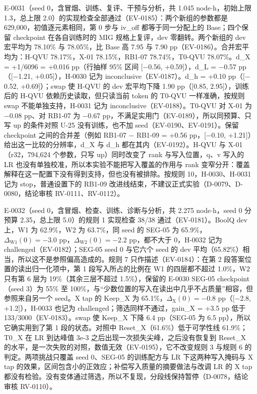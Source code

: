 \documentclass[11pt]{article}
\begin{document}
E-0031（seed 0，含冒烟、训练、复评、干预与分析，共 1.045 node$\cdot$h，初始上限 1.3，总上限 2.0）的实现检查全部通过（EV-0185）：两个新组的参数都是 629,000，初值逐元素相同，第 0 步与 iv\_off 都等于同一分配上的 Base；四个保留 checkpoint 在各自训练时的 MIG 规格上复评，dev 零翻转。两个新组的 dev 宏平均为 78.10\% 与 78.05\%，比 Base 高 7.95 与 7.90 pp（EV-0186）。合并宏平均为：H-QVU 78.17\%，X-01 78.15\%，RB1-07 78.74\%，T0-QVU 78.07\%。d\_X = +1/6096 = +0.016 pp（行抽样 95\% 区间 [$-$0.56, +0.59]），d\_L = $-$0.57 pp（[$-$1.21, +0.05]），H-0030 记为 inconclusive（EV-0187）。d\_h = +0.10 pp（[$-$0.52, +0.69]）；swap 使 H-QVU 的 dev 宏平均下降 1.90 pp（[0.85, 2.95]），训练后的 H-QVU 依赖历史读取，但只读当前 token 的 T0-QVU 一样准确，按规则 swap 不能单独支持，H-0031 记为 inconclusive（EV-0188）。T0-QVU 对 X-01 为 $-$0.08 pp、对 RB1-07 为 $-$0.67 pp，不满足实用门（EV-0189），所以同预算、只写 up 的条件对照 U-25 没有训练，也不加 seed（EV-0190、EV-0191）。保留 checkpoint 之间的合并差（例如 RB1-07 $-$ RB1-09 = +0.56 pp，[$-$0.10, +1.21]）给出这一比较的分辨率，d\_X 与 d\_h 都在其内（EV-0192）。H-QVU 与 X-01（r32，794,624 个参数，只写 up）同时改变了 rank 与写入位置，q、v 写入的 LR 也没有单独校准，所以本实验不能把写入覆盖的作用与 rank 变窄分开：覆盖解释在这一配置下没有得到支持，但也没有被排除。按规则 10，H-0030、H-0031 记为 stop，普通设置下的 RB1-09 改进线结束，不建议正式实验（D-0079、D-0080，结论审核 RV-0111、RV-0112）。

E-0032（seed 0，含冒烟、检查、训练、诊断与分析，共 2.275 node$\cdot$h，seed 0 分预算 2.35，总上限 5.0）的规则 1 实现检查 38/38 通过（EV-0181）。BoolQ dev 上，W1 为 62.9\%，W2 为 63.7\%，同 seed 的 SEG-05 为 65.9\%，$\Delta_\text{W1}(0) = -3.0$ pp，$\Delta_\text{W2}(0) = -2.2$ pp，都不大于 0，H-0032 记为 challenged（EV-0182）；SEG-05 seed 0 与它六个 seed 的 dev 平均（65.82\%）相当，所以这不是参照偏高造成的。规则 7 只作描述（EV-0184）：在第 2 段答案位置的读出归一化项中，第 1 段写入所占的比例在 W1 的四层都不超过 1.0\%，W2 只有第 6 层为 19\%（其余三层不超过 1.5\%），保留的 E-0030 SEG-05 checkpoint（seed 3）为 55\% 至 100\%，与``少数位置的写入在读出中几乎不占质量''相容，但参照来自另一个 seed。X tap 的 Keep\_X 为 65.1\%，$\Delta_\text{X}(0) = -0.8$ pp（[$-$2.8, +1.2]），H-0033 也记为 challenged；筛选同样不通过，gain\_X = +3.5 pp 低于 133/3000（EV-0183）。swap 使 Keep\_X 下降 6.4 pp（SEG-05 为 6.5 pp），所以它确实用到了第 1 段的状态。对照中 Reset\_X（61.6\%）低于可学性线 61.9\%；T0\_X 在 LR 到达峰值 3e-3 之后出现一次损失尖峰，之后没有恢复到 Reset\_X 的水平，是一次失败的对照，数值无效（EV-0195），它不改变规则 3 与规则 6 的判定。两项挑战只覆盖 seed 0、SEG-05 的训练配方与 LR 下这两种写入掩码与 X tap 的效果，区间包含小的正效应；补偿写入质量的摘要做法与改调 LR 的 X tap 都没有检验。没有变体通过筛选，所以不复现，分段线保持暂停（D-0078，结论审核 RV-0110）。
\end{document}
